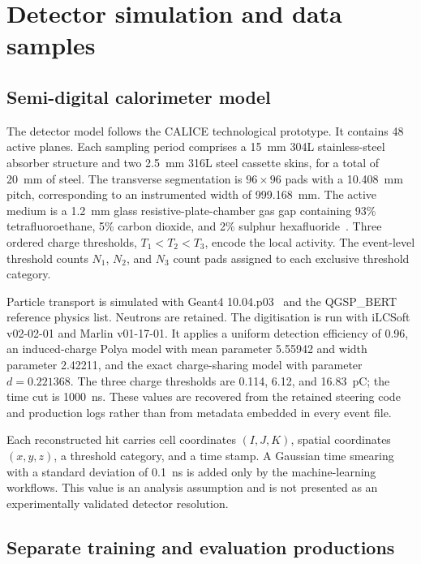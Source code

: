 \documentclass[11pt,a4paper]{article}
\begin{document}
\section{Detector simulation and data samples}
\label{sec:data}

\subsection{Semi-digital calorimeter model}

The detector model follows the CALICE technological prototype. It contains 48 active
planes. Each sampling period comprises a \SI{15}{mm} 304L stainless-steel absorber
structure and two \SI{2.5}{mm} 316L steel cassette skins, for a total of \SI{20}{mm}
of steel. The transverse segmentation is $96\times96$ pads with a
\SI{10.408}{mm} pitch, corresponding to an instrumented width of
\SI{999.168}{mm}. The active medium is a \SI{1.2}{mm} glass resistive-plate-chamber
gas gap containing 93\% tetrafluoroethane, 5\% carbon dioxide, and 2\% sulphur
hexafluoride~\cite{bedjidian2011grpc}. Three ordered charge
thresholds, $T_1<T_2<T_3$, encode the local activity. The event-level threshold counts
$N_1$, $N_2$, and $N_3$ count pads assigned to each exclusive threshold category.

Particle transport is simulated with Geant4 10.04.p03~\cite{geant4,geant4update}
and the QGSP\_BERT reference physics list. Neutrons are retained. The digitisation is
run with iLCSoft v02-02-01 and Marlin v01-17-01. It applies a uniform detection
efficiency of 0.96, an induced-charge Polya model with mean parameter 5.55942 and
width parameter 2.42211, and the exact charge-sharing model with parameter
$d=0.221368$. The three charge thresholds are 0.114, 6.12, and 16.83~pC; the time
cut is \SI{1000}{ns}. These values are recovered from the retained steering code and
production logs rather than from metadata embedded in every event file.

Each reconstructed hit carries cell coordinates $(I,J,K)$, spatial coordinates
$(x,y,z)$, a threshold category, and a time stamp. A Gaussian time smearing with a
standard deviation of \SI{0.1}{ns} is added only by the machine-learning workflows.
This value is an analysis assumption and is not presented as an experimentally
validated detector resolution.

\subsection{Separate training and evaluation productions}
\end{document}
